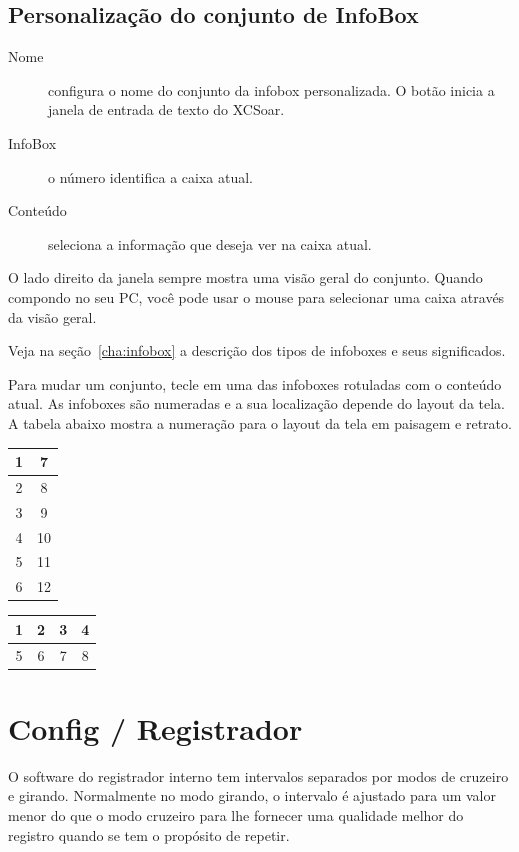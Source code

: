 \subsection*{Personalização do conjunto de InfoBox}

\begin{description}
\item[Nome]  configura o nome do conjunto da infobox personalizada.  O botão inicia a janela de entrada de texto do XCSoar.
\item[InfoBox]  o número identifica a caixa atual.
\item[Conteúdo] seleciona a informação que deseja ver na caixa atual.
\end{description}

O lado direito da janela sempre mostra uma visão geral do conjunto.  Quando compondo no seu PC, você pode usar o mouse para selecionar uma caixa através da visão geral.

Veja na seção~\ref{cha:infobox} a descrição dos tipos de infoboxes e seus significados.

Para mudar um conjunto, tecle em uma das infoboxes rotuladas com o conteúdo atual.  As infoboxes são numeradas e a sua localização depende do layout da tela.  A tabela abaixo mostra a numeração para o layout da tela em paisagem e retrato. 

\begin{multicols}{2}
\begin{tabular}{|c|c|}
\hline
1 & 7 \\
\hline
2 & 8 \\
\hline
3 & 9 \\
\hline
4 & 10 \\
\hline
5 & 11 \\
\hline
6 & 12 \\
\hline
\end{tabular}

\begin{tabular}{|c|c|c|c|}
\hline
1 & 2 & 3 & 4 \\
\hline
\hline
5 & 6 & 7 & 8 \\
\hline
\end{tabular}
\end{multicols}


\section{Config / Registrador} \label{conf:logger}

O software do registrador interno tem intervalos separados por modos de cruzeiro e girando.  Normalmente no modo girando, o intervalo é ajustado para um valor menor do que o modo cruzeiro para lhe fornecer uma qualidade melhor do registro quando se tem o propósito de repetir.

